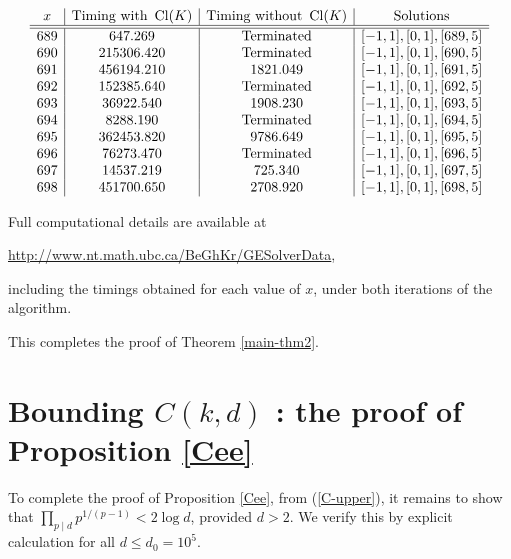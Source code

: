 \[\begin{array}{c | c| c|c}
x & \text{Timing with } \operatorname{Cl}(K) & \text{Timing without } \operatorname{Cl}(K) & \text{Solutions} \\ \hline \hline
689 & 647.269 	& \text{Terminated} & [ -1, 1 ],[ 0, 1 ],[ 689, 5 ]  \\
690  & 215306.420 & \text{Terminated} & [ -1, 1 ],[ 0, 1 ],[ 690, 5 ] \\
691  & 456194.210 &   1821.049 & [ -1, 1 ],[ 0, 1 ],[ 691, 5 ] \\
692  & 152385.640 & \text{Terminated} & [ -1, 1 ],[ 0, 1 ],[ 692, 5 ] \\
693  & 36922.540  &    1908.230  & [ -1, 1 ],[ 0, 1 ],[ 693, 5 ]  \\
694  & 8288.190     & \text{Terminated}    &   [ -1, 1 ],[ 0, 1 ],[ 694, 5 ]   \\
695  & 362453.820  &   9786.649  &  [ -1, 1 ],[ 0, 1 ],[ 695, 5 ]  \\
696  & 76273.470 & \text{Terminated}  &    [ -1, 1 ],[ 0, 1 ],[ 696, 5 ] \\
697  & 14537.219  &    725.340  & [ -1, 1 ],[ 0, 1 ],[ 697, 5 ]  \\
698  & 451700.650 &    2708.920 &    [ -1, 1 ],[ 0, 1 ],[ 698, 5 ] \\
\end{array}\]
 
Full computational details are available at
\begin{center}
\url{http://www.nt.math.ubc.ca/BeGhKr/GESolverData},
\end{center}
including the timings obtained for each value of $x$, under both iterations of the algorithm. 

This completes the proof of Theorem \ref{main-thm2}.


\section{Bounding $C(k,d)$ : the proof of Proposition \ref{Cee}} \label{Cee-proof}


To complete the proof of Proposition \ref{Cee}, from (\ref{C-upper}), it remains to show that $\prod_{p \mid d} p^{1/(p-1)}  < 2 \log d$, provided $d > 2$. 
We verify this by explicit calculation for all $d \leq d_0 = 10^5$. 

